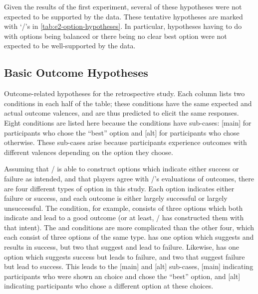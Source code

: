 Given the results of the first experiment, several of these hypotheses were not expected to be supported by the data.
%
These tentative hypotheses are marked with `\lc/'s in \cref{tab:e2-option-hypotheses}.
%
In particular, hypotheses having to do with options being balanced or there being no clear best option were not expected to be well-supported by the data.


\subsection{Basic Outcome Hypotheses}

\begin{table}[!p]
\centering
\bgroup
\def\arraystretch{1.3}
\setlength{\tabcolsep}{0.6em}

\egroup
\caption[Retrospective outcome hypotheses]{Outcome-related hypotheses for the retrospective study. Each column lists two conditions in each half of the table; these conditions have the same expected and actual outcome valences, and are thus predicted to elicit the same responses. Eight conditions are listed here because the  conditions have sub-cases: [main] for participants who chose the ``best'' option and [alt] for participants who chose otherwise. These sub-cases arise because participants experience outcomes with different valences depending on the option they choose.}
  \label{tab:e2-outcome-hypotheses}
\end{table}

Assuming that \dunyazad/ is able to construct options which indicate either success or failure as intended, and that players agree with \dunyazad/'s evaluations of outcomes, there are four different types of option in this study.
%
Each option indicates either failure or success, and each outcome is either largely successful or largely unsuccessful.
%
The \exps{} condition, for example, consists of three options which both indicate and lead to a good outcome (or at least, \dunyazad/ has constructed them with that intent).
%
The \obvs{} and \obvf{} conditions are more complicated than the other four, which each consist of three options of the same type.
%
\obvs{} has one option which suggests and results in success, but two that suggest and lead to failure.
%
Likewise, \obvf{} has one option which suggests success but leads to failure, and two that suggest failure but lead to success.
%
This leads to the [main] and [alt] sub-cases, [main] indicating participants who were shown an  choice and chose the ``best'' option, and [alt] indicating participants who chose a different option at these choices.


